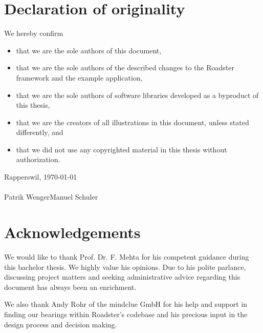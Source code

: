 \documentclass[a4paper]{report}
\begin{document}
\chapter*{Declaration of originality}
We hereby confirm

\begin{itemize}
	\item that we are the sole authors of this document,
	\item that we are the sole authors of the described changes to the Roadster framework and the example application,
	\item that we are the sole authors of software libraries developed as a byproduct of this thesis,
	\item that we are the creators of all illustrations in this document, unless stated differently, and
	\item that we did not use any copyrighted material in this thesis without authorization.
\end{itemize}

\vfill
\noindent
Rapperswil, \today\\
\vspace{2.5cm}\\
\noindent
Patrik Wenger\hspace{5cm}Manuel Schuler
\vspace{5.5cm}\\

\clearpage

%

\chapter*{Acknowledgements}
We would like to thank Prof. Dr. F. Mehta for his competent guidance during
this bachelor thesis.  We highly value his opinions. Due to his polite
parlance, discussing project matters and seeking administrative advice
regarding this document has always been an enrichment.

We also thank Andy Rohr of the mindclue GmbH for his help and support in
finding our bearings within Roadster's codebase and his precious input in the
design process and decision making.
\end{document}
